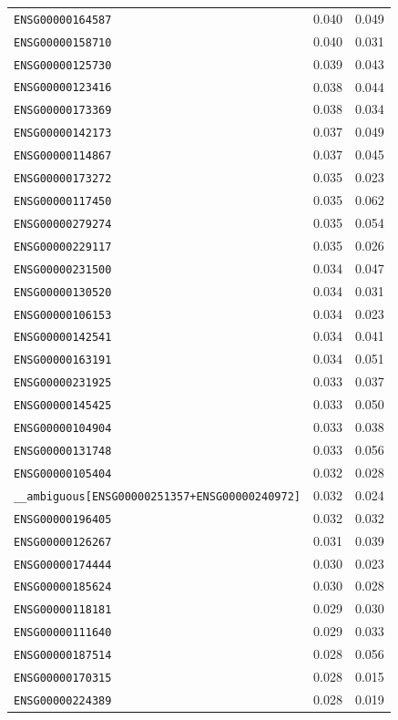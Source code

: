 \begin{longtable}{lcc}
\texttt{ENSG00000164587} & 0.040 & 0.049 \\
\texttt{ENSG00000158710} & 0.040 & 0.031 \\
\texttt{ENSG00000125730} & 0.039 & 0.043 \\
\texttt{ENSG00000123416} & 0.038 & 0.044 \\
\texttt{ENSG00000173369} & 0.038 & 0.034 \\
\texttt{ENSG00000142173} & 0.037 & 0.049 \\
\texttt{ENSG00000114867} & 0.037 & 0.045 \\
\texttt{ENSG00000173272} & 0.035 & 0.023 \\
\texttt{ENSG00000117450} & 0.035 & 0.062 \\
\texttt{ENSG00000279274} & 0.035 & 0.054 \\
\texttt{ENSG00000229117} & 0.035 & 0.026 \\
\texttt{ENSG00000231500} & 0.034 & 0.047 \\
\texttt{ENSG00000130520} & 0.034 & 0.031 \\
\texttt{ENSG00000106153} & 0.034 & 0.023 \\
\texttt{ENSG00000142541} & 0.034 & 0.041 \\
\texttt{ENSG00000163191} & 0.034 & 0.051 \\
\texttt{ENSG00000231925} & 0.033 & 0.037 \\
\texttt{ENSG00000145425} & 0.033 & 0.050 \\
\texttt{ENSG00000104904} & 0.033 & 0.038 \\
\texttt{ENSG00000131748} & 0.033 & 0.056 \\
\texttt{ENSG00000105404} & 0.032 & 0.028 \\
\texttt{\_\_ambiguous[ENSG00000251357+ENSG00000240972]} & 0.032 & 0.024 \\
\texttt{ENSG00000196405} & 0.032 & 0.032 \\
\texttt{ENSG00000126267} & 0.031 & 0.039 \\
\texttt{ENSG00000174444} & 0.030 & 0.023 \\
\texttt{ENSG00000185624} & 0.030 & 0.028 \\
\texttt{ENSG00000118181} & 0.029 & 0.030 \\
\texttt{ENSG00000111640} & 0.029 & 0.033 \\
\texttt{ENSG00000187514} & 0.028 & 0.056 \\
\texttt{ENSG00000170315} & 0.028 & 0.015 \\
\texttt{ENSG00000224389} & 0.028 & 0.019 \\

\end{longtable}
